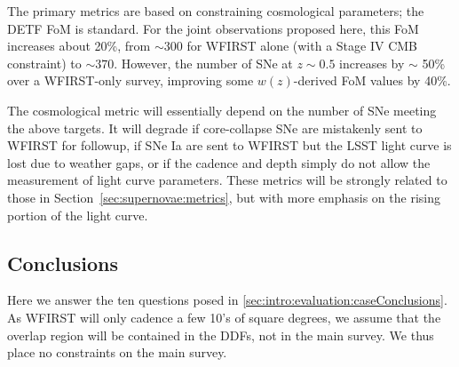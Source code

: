 
The primary metrics are based on constraining cosmological parameters; the DETF FoM is standard. For the joint observations proposed here, this FoM increases about 20\%, from $\sim 300$ for WFIRST alone (with a Stage IV CMB constraint) to $\sim 370$. However, the number of SNe at $z \sim 0.5$ increases by $\sim$ 50\% over a WFIRST-only survey, improving some $w(z)$-derived FoM values by 40\%.

The cosmological metric will essentially depend on the number of SNe meeting the above targets. It will degrade if core-collapse SNe are mistakenly sent to WFIRST for followup, if SNe Ia are sent to WFIRST but the LSST light curve is lost due to weather gaps, or if the cadence and depth simply do not allow the measurement of light curve parameters. These metrics will be strongly related to those in Section~\ref{sec:supernovae:metrics}, but with more emphasis on the rising portion of the light curve.








%
\subsection{Conclusions}

Here we answer the ten questions posed in
\autoref{sec:intro:evaluation:caseConclusions}. As WFIRST will only cadence a few 10's of square degrees, we assume that the overlap region will be contained in the DDFs, not in the main survey. We thus place no constraints on the main survey.

